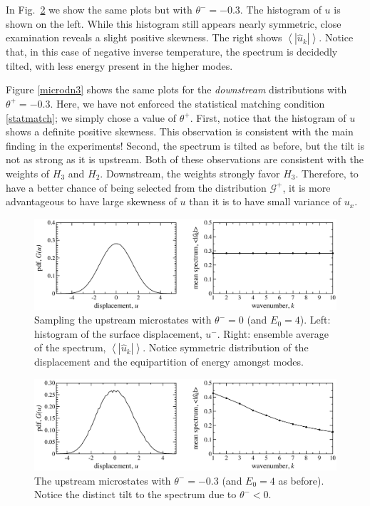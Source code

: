 \documentclass[12pt]{article}
\newcommand{\abs}[1]{\left| #1 \right|}
\newcommand{\mean}[1]{\left< #1 \right>}
\newcommand{\uhat}{\hat{u}}
\newcommand{\Gibbs}{\mathcal{G}}
\begin{document}
 In Fig.~\ref{microup3} we show the same plots but with $\theta^- = -0.3$. The histogram of $u$ is shown on the left. While this histogram still appears nearly symmetric, close examination reveals a slight positive skewness. The right shows $\mean{\abs{\uhat_k}}$. Notice that, in this case of negative inverse temperature, the spectrum is decidedly tilted, with less energy present in the higher modes.
 
 Figure \ref{microdn3} shows the same plots for the {\em downstream} distributions with $\theta^+ = -0.3$. Here, we have not enforced the statistical matching condition \eqref{statmatch}; we simply chose a value of $\theta^+$. First, notice that the histogram of $u$ shows a definite positive skewness. This observation is consistent with the main finding in the experiments! Second, the spectrum is tilted as before, but the tilt is not as strong as it is upstream. Both of these observations are consistent with the weights of $H_3$ and $H_2$. Downstream, the weights strongly favor $H_3$. Therefore, to have a better chance of being selected from the distribution $\Gibbs^{+}$, it is more advantageous to have large skewness of $u$ than it is to have small variance of $u_x$.
  
\begin{figure}[p]%
\begin{center}
\includegraphics[width = 0.8 \textwidth]{microup0}
\caption{Sampling the upstream microstates with $\theta^- = 0$ (and $E_0 = 4$). Left: histogram of the surface displacement, $u^-$. Right: ensemble average of the spectrum, $\mean{\abs{\uhat_k}}$. Notice symmetric distribution of the displacement and the equipartition of energy amongst modes.}
\label{microup0}
\end{center}
\end{figure}
 
\begin{figure}[p]%
\begin{center}
\includegraphics[width = 0.8 \textwidth]{microup3}
\caption{The upstream microstates with $\theta^- = -0.3$ (and $E_0 = 4$ as before). Notice the distinct tilt to the spectrum due to $\theta^- < 0$.}
\label{microup3}
\end{center}
\end{figure}
 
\end{document}
